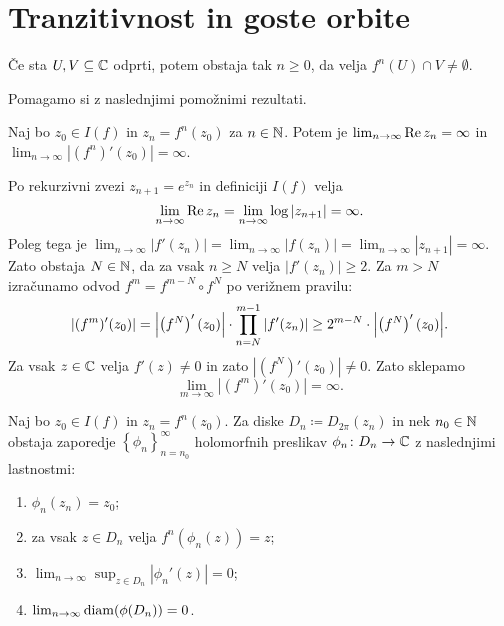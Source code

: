 \section{Tranzitivnost in goste orbite} \label{sec:transitivity}

\begin{izrek} \label{thm:transitivity}
    Če sta \(U, V \subseteq \mathbb C\) odprti, potem obstaja tak \(n \geq 0\), da velja \(f^{n} (U) \cap V \neq \emptyset\).
\end{izrek}

\noindent Pomagamo si z naslednjimi pomožnimi rezultati.

\begin{trditev}
    Naj bo \(z_0 \in I (f)\) in \(z_n = f^n (z_0)\) za \(n \in \mathbb N\). Potem je \(\lim_{n \to \infty} \operatorname{Re} z_n = \infty\) in \(\lim_{n \to \infty} |(f^n)' (z_0)| = \infty\).
\end{trditev}

\begin{dokaz}
    Po rekurzivni zvezi \(z_{n + 1} = e^{z_n}\) in definiciji \(I (f)\) velja
    \[\lim_{n \to \infty} \operatorname{Re} z_n = \lim_{n \to \infty} \log |z_{n + 1}| = \infty.\]
    Poleg tega je \(\lim_{n \to \infty} |f' (z_n)| = \lim_{n \to \infty} |f (z_n)| = \lim_{n \to \infty} |z_{n + 1}| = \infty\). Zato obstaja \(N \in \mathbb N\), da za vsak \(n \geq N\) velja \(|f' (z_n)| \geq 2\). Za \(m > N\) izračunamo odvod \(f^{m} = f^{m - N} \circ f^{N}\) po verižnem pravilu:
    \[|(f^{m})' (z_0)| = \abs{ \prt{f^{N}}' (z_0) } \cdot \prod_{n = N}^{m - 1} |f' (z_n)| \geq 2^{m - N} \cdot \abs{ \prt{f^{N}}' (z_0) }.\]
    Za vsak \(z \in \mathbb C\) velja \(f' (z) \neq 0\) in zato \(|(f^N)' (z_0)| \neq 0\). Zato sklepamo
    \[\lim_{m \to \infty} |(f^{m})' (z_0)| = \infty.\]
\end{dokaz}

\begin{trditev} \label{prop:small_disks}
    Naj bo \(z_0 \in I (f)\) in \(z_n = f^{n} (z_0)\). Za diske \(D_n \coloneq D_{2 \pi} (z_n)\) in nek \(n_0 \in \mathbb N\) obstaja zaporedje \(\left\{ \phi_n \right\}_{n = n_0}^{\infty}\) holomorfnih preslikav \(\phi_n \colon D_n \to \mathbb C\) z naslednjimi lastnostmi:
    \begin{enumerate}
        \item \label{item:ena} \(\phi_n (z_n) = z_0\);
        \item \label{item:dva} za vsak \(z \in D_n\) velja \(f^n (\phi_n (z)) = z\);
        \item \label{item:tri} \(\lim_{n \to \infty} \sup_{z \in D_n} |\phi_n' (z)| = 0\);
        \item \label{item:stiri} \(\lim_{n \to \infty} \operatorname{diam} (\phi (D_n)) = 0\).
    \end{enumerate}
\end{trditev}

